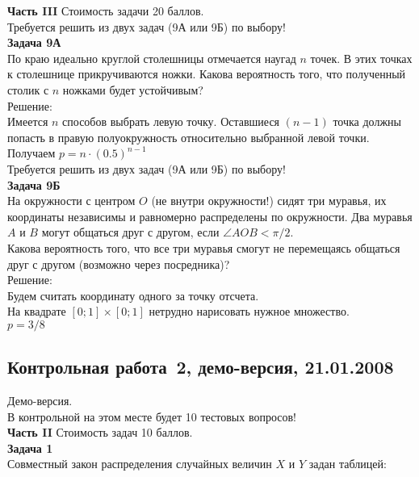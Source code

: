 \documentclass[pdftex,12pt,a4paper]{article}
\begin{document}
\textbf{Часть III} Стоимость задачи 20 баллов. \\

Требуется решить \textbf{} из двух задач (9А или 9Б) по
выбору! \\

\textbf{Задача 9А} \\
По краю идеально круглой столешницы отмечается наугад $n$ точек. В этих точках к столешнице прикручиваются ножки. Какова вероятность того, что полученный столик с $n$ ножками будет устойчивым? \\
Решение: \\
Имеется $n$ способов выбрать левую точку. Оставшиеся $(n-1)$ точка должны попасть в правую полуокружность относительно выбранной левой точки.\\
Получаем $p=n\cdot (0.5)^{n-1}$ \\


Требуется решить \textbf{} из двух задач (9А или 9Б) по
выбору! \\

\textbf{Задача 9Б} \\
На окружности  с центром $O$ (не внутри окружности!) сидят три муравья, их
координаты независимы и равномерно распределены по окружности. Два
муравья $A$ и $B$ могут общаться друг с другом, если $\angle AOB<\pi/2$. \\
Какова вероятность того, что все три муравья смогут не перемещаясь
общаться друг с другом (возможно через посредника)? \\
Решение: \\
Будем считать координату одного за точку отсчета. \\
На квадрате $[0;1]\times[0;1]$ нетрудно нарисовать нужное множество. \\
$p=3/8$ \\


\subsection{Контрольная работа \No\,2, демо-версия, 21.01.2008}

Демо-версия. \\

В контрольной на этом месте будет 10 тестовых вопросов! \\


\textbf{Часть II} Стоимость задач 10 баллов. \\

\textbf{Задача 1} \\ %
Совместный закон распределения случайных величин  $X$  и  $Y$
задан таблицей:
\end{document}
